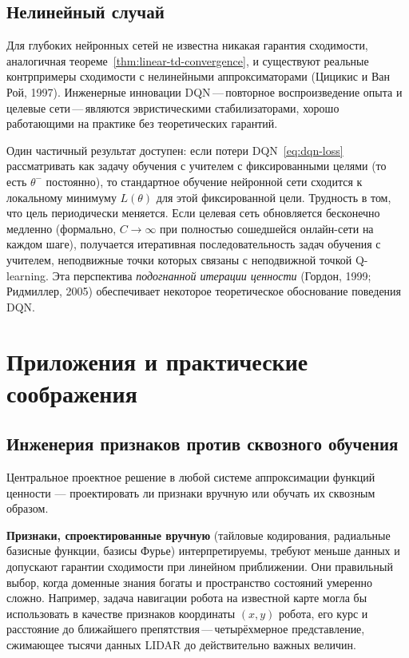 \subsection{Нелинейный случай}

Для глубоких нейронных сетей не известна никакая гарантия сходимости, аналогичная теореме~\ref{thm:linear-td-convergence}, и существуют реальные контрпримеры сходимости с нелинейными аппроксиматорами (Цицикис и Ван Рой, 1997).  Инженерные инновации DQN\,---\,повторное воспроизведение опыта и целевые сети\,---\,являются эвристическими стабилизаторами, хорошо работающими на практике без теоретических гарантий.

Один частичный результат доступен: если потери DQN~\eqref{eq:dqn-loss} рассматривать как задачу обучения с учителем с фиксированными целями (то есть $\theta^-$ постоянно), то стандартное обучение нейронной сети сходится к локальному минимуму $L(\theta)$ для этой фиксированной цели.  Трудность в том, что цель периодически меняется.  Если целевая сеть обновляется бесконечно медленно (формально, $C \to \infty$ при полностью сошедшейся онлайн-сети на каждом шаге), получается итеративная последовательность задач обучения с учителем, неподвижные точки которых связаны с неподвижной точкой Q-learning.  Эта перспектива \emph{подогнанной итерации ценности} (Гордон, 1999; Ридмиллер, 2005) обеспечивает некоторое теоретическое обоснование поведения DQN.

\section{Приложения и практические соображения}
\label{sec:applications-vfa}

\subsection{Инженерия признаков против сквозного обучения}

Центральное проектное решение в любой системе аппроксимации функций ценности --- проектировать ли признаки вручную или обучать их сквозным образом.

\textbf{Признаки, спроектированные вручную} (тайловые кодирования, радиальные базисные функции, базисы Фурье) интерпретируемы, требуют меньше данных и допускают гарантии сходимости при линейном приближении.  Они правильный выбор, когда доменные знания богаты и пространство состояний умеренно сложно.  Например, задача навигации робота на известной карте могла бы использовать в качестве признаков координаты $(x, y)$ робота, его курс и расстояние до ближайшего препятствия\,---\,четырёхмерное представление, сжимающее тысячи данных LIDAR до действительно важных величин.

